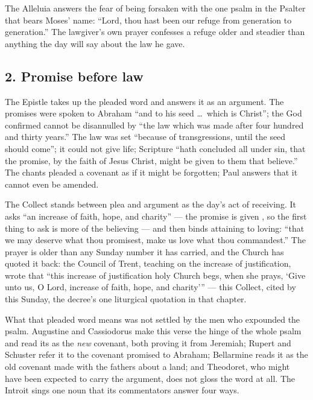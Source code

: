 The Alleluia answers the fear of being forsaken  with the one
psalm in the Psalter that bears Moses' name: ``Lord, thou hast been our refuge
from generation to generation.'' The lawgiver's own prayer confesses a refuge
older and steadier than anything the day will say about the law he gave.

\subsection*{2. Promise before law}

The Epistle takes up the pleaded word and answers it as an argument. The
promises were spoken to Abraham ``and to his seed \dots\ which is Christ'';
the  God confirmed cannot be disannulled by ``the law
which was made after four hundred and thirty years.'' The law was set
``because of transgressions, until the seed should come''; it could not give
life; Scripture ``hath concluded all under sin, that the promise, by the
faith of Jesus Christ, might be given to them that believe.'' The chants
pleaded a covenant as if it might be forgotten; Paul answers that it cannot
even be amended.

The Collect stands between plea and argument as the day's act of receiving.
It asks ``an increase of faith, hope, and charity'' --- the promise is given
, so the first thing to ask is more of the believing ---
and then binds attaining to loving: ``that we may deserve what thou promisest,
make us love what thou commandest.'' The prayer is older than any Sunday
number it has carried, and the Church has quoted it back: the Council of
Trent, teaching on the increase of justification, wrote that ``this increase
of justification holy Church begs, when she prays, `Give unto us, O Lord,
increase of faith, hope, and charity''' --- this Collect, cited by this
Sunday, the decree's one liturgical quotation in that chapter.

What that pleaded word means was not settled by the men who expounded the
psalm. Augustine and Cassiodorus make this verse the hinge of the whole psalm
and read its  as the \emph{new} covenant, both proving it
from Jeremiah; Rupert and Schuster refer it to the covenant promised to
Abraham; Bellarmine reads it as the old covenant made with the fathers about a
land; and Theodoret, who might have been expected to carry the argument, does
not gloss the word at all. The Introit sings one noun that its commentators
answer four ways.

